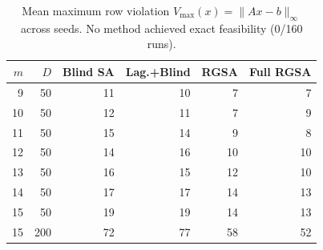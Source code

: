 \begin{table}[htbp]
\centering
\caption{Mean maximum row violation $V_{\max}(x)=\|Ax-b\|_\infty$ across seeds.  No method achieved exact feasibility (0/160 runs).}
\label{tab:violations}
\footnotesize
\begin{tabular}{rr|rrrr}
\toprule
$m$ & $D$ & Blind SA & Lag.+Blind & RGSA & Full RGSA \\
\midrule
9 & 50 & 11 & 10 & 7 & 7 \\
10 & 50 & 12 & 11 & 7 & 9 \\
11 & 50 & 15 & 14 & 9 & 8 \\
12 & 50 & 14 & 16 & 10 & 10 \\
13 & 50 & 16 & 15 & 12 & 10 \\
14 & 50 & 17 & 17 & 14 & 13 \\
15 & 50 & 19 & 19 & 14 & 13 \\
15 & 200 & 72 & 77 & 58 & 52 \\
\bottomrule
\end{tabular}
\end{table}
